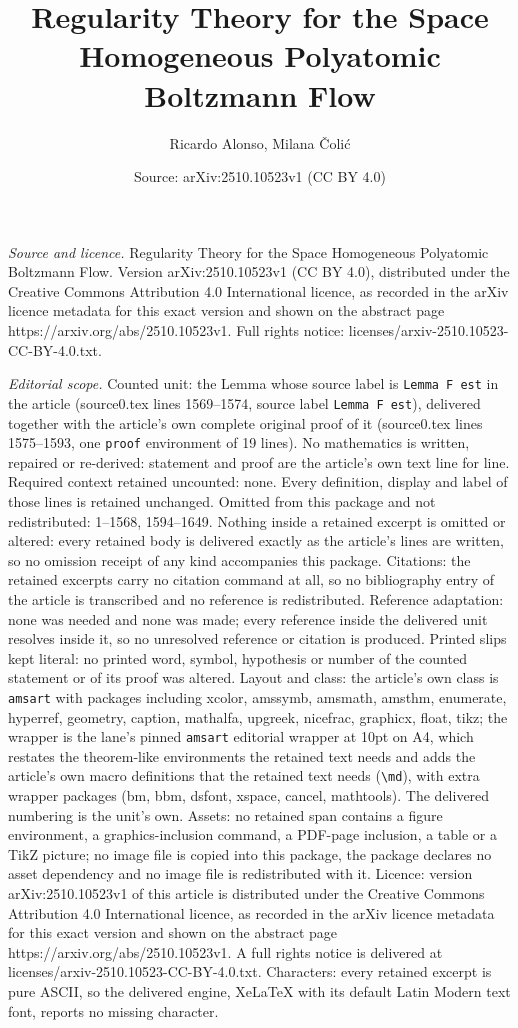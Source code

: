 \documentclass[10pt,a4paper]{amsart}
\title[Regularity Theory for the Space Homogeneous Polyatomic Boltz]{Regularity Theory for the Space Homogeneous Polyatomic Boltzmann Flow}
\author{Ricardo Alonso, Milana \v{C}oli\'c}
\date{Source: arXiv:2510.10523v1 (CC BY 4.0)}
\begin{document}
\maketitle

\noindent\emph{Source and licence.} Regularity Theory for the Space Homogeneous Polyatomic Boltzmann Flow. Version arXiv:2510.10523v1 (CC BY 4.0), distributed under the Creative Commons Attribution 4.0 International licence, as recorded in the arXiv licence metadata for this exact version and shown on the abstract page https://arxiv.org/abs/2510.10523v1. Full rights notice: licenses/arxiv-2510.10523-CC-BY-4.0.txt.\par\smallskip

\noindent\textit{Editorial scope.} Counted unit: the Lemma whose source label is \texttt{Lemma F est} in the article (source0.tex lines 1569--1574, source label \texttt{Lemma F est}), delivered together with the article's own complete original proof of it (source0.tex lines 1575--1593, one \texttt{proof} environment of 19 lines). No mathematics is written, repaired or re-derived: statement and proof are the article's own text line for line. Required context retained uncounted: none. Every definition, display and label of those lines is retained unchanged. Omitted from this package and not redistributed: 1--1568, 1594--1649. Nothing inside a retained excerpt is omitted or altered: every retained body is delivered exactly as the article's lines are written, so no omission receipt of any kind accompanies this package. Citations: the retained excerpts carry no citation command at all, so no bibliography entry of the article is transcribed and no reference is redistributed. Reference adaptation: none was needed and none was made; every reference inside the delivered unit resolves inside it, so no unresolved reference or citation is produced. Printed slips kept literal: no printed word, symbol, hypothesis or number of the counted statement or of its proof was altered. Layout and class: the article's own class is \texttt{amsart} with packages including xcolor, amssymb, amsmath, amsthm, enumerate, hyperref, geometry, caption, mathalfa, upgreek, nicefrac, graphicx, float, tikz; the wrapper is the lane's pinned \texttt{amsart} editorial wrapper at 10pt on A4, which restates the theorem-like environments the retained text needs and adds the article's own macro definitions that the retained text needs (\texttt{\textbackslash md}), with extra wrapper packages (bm, bbm, dsfont, xspace, cancel, mathtools). The delivered numbering is the unit's own. Assets: no retained span contains a figure environment, a graphics-inclusion command, a PDF-page inclusion, a table or a TikZ picture; no image file is copied into this package, the package declares no asset dependency and no image file is redistributed with it. Licence: version arXiv:2510.10523v1 of this article is distributed under the Creative Commons Attribution 4.0 International licence, as recorded in the arXiv licence metadata for this exact version and shown on the abstract page https://arxiv.org/abs/2510.10523v1. A full rights notice is delivered at licenses/arxiv-2510.10523-CC-BY-4.0.txt. Characters: every retained excerpt is pure ASCII, so the delivered engine, XeLaTeX with its default Latin Modern text font, reports no missing character.
\end{document}
